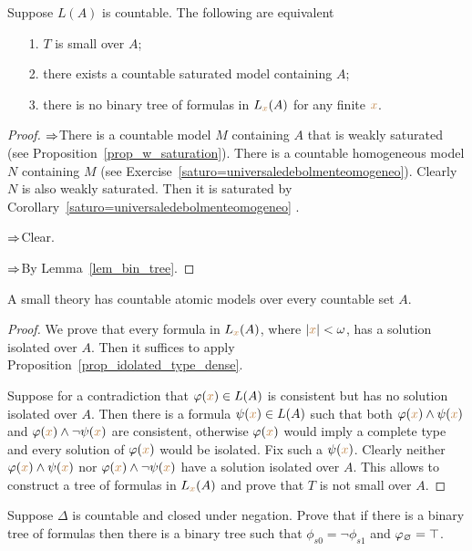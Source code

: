 \documentclass[creche.tex]{subfiles}
\begin{document}
\begin{proposition}\label{prop_small_equivalents}
Suppose $L(A)$ is countable.
The following are equivalent\nobreak
\begin{itemize}   
\item[1.] $T$ is small over $A$;
\item[2.] there exists a countable saturated model containing $A$;
\item[3.] there is no binary tree of formulas in $L_{\color{brown} x}(A)$ for any finite ${\color{brown} x}$.
\end{itemize}
\end{proposition}
\begin{proof}$\Rightarrow$\quad There is a countable model $M$ containing $A$ that is weakly saturated (see Proposition~\ref{prop_w_saturation}).
There is a countable homogeneous model $N$ containing $M$ (see Exercise~\ref{saturo=universaledebolmenteomogeneo}).
Clearly $N$ is also weakly saturated.
Then it is saturated by Corollary~\ref{saturo=universaledebolmenteomogeneo} .


$\Rightarrow$\quad Clear.

$\Rightarrow$\quad By Lemma~\ref{lem_bin_tree}.
\end{proof}


\begin{proposition} 
A small theory has countable atomic models over every countable set $A$.
\end{proposition}
\begin{proof}
We prove that every formula in $L_{\color{brown} x}(A)$, where $|{\color{brown} x}|<\omega$, has a solution isolated over $A$.
Then it suffices to apply Proposition~\ref{prop_idolated_type_dense}.


Suppose for a contradiction that $\varphi({\color{brown} x})\in L(A)$ is consistent but has no solution isolated over $A$.
Then there is a formula $\psi({\color{brown} x})\in L(A)$ such that both $\varphi({\color{brown} x})\wedge\psi({\color{brown} x})$ and $\varphi({\color{brown} x})\wedge\neg\psi({\color{brown} x})$ are consistent, otherwise $\varphi({\color{brown} x})$ would imply a complete type and every solution of $\varphi({\color{brown} x})$ would be isolated.
Fix such a $\psi({\color{brown} x})$.
Clearly neither $\varphi({\color{brown} x})\wedge\psi({\color{brown} x})$ nor $\varphi({\color{brown} x})\wedge\neg\psi({\color{brown} x})$ have a solution isolated over $A$.
This allows to construct a tree of formulas in $L_{\color{brown} x}(A)$ and prove that $T$ is not small over $A$.
\end{proof}

\begin{exercise}\label{ex_binary_tree_canonical}
Suppose $\Delta$ is countable and closed under negation.
Prove that if there is a binary tree of formulas  then there is a binary tree such that $\phi_{s0}=\neg\phi_{s1}$ and $\varphi_{\varnothing}=\top$.\QED
\end{exercise}
\end{document}
